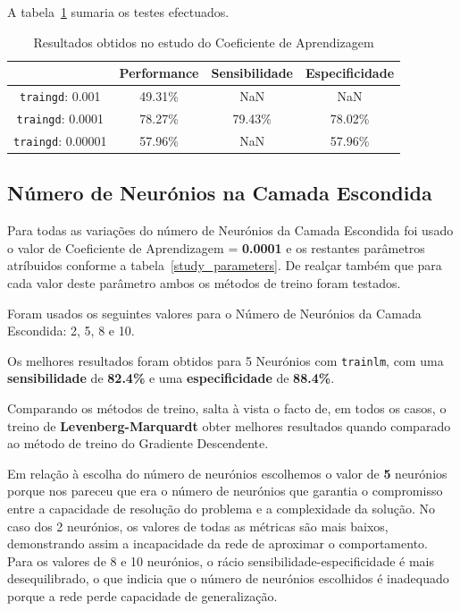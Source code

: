 \documentclass{article}
\begin{document}
A tabela~\ref{table_learning_rate} sumaria os testes efectuados.

\begin{table}[!h]
\centering
	\caption{Resultados obtidos no estudo do Coeficiente de Aprendizagem}
	\label{table_learning_rate}
	\begin{tabular}{|c|c|c|c|}
	\hline 
	 & \textbf{Performance} & \textbf{Sensibilidade} & \textbf{Especificidade} \\ 
	\hline 
	\texttt{traingd}: 0.001 & 49.31\%  & NaN & NaN \\ 
	\hline 
	\texttt{traingd}: 0.0001 & 78.27\% & 79.43\% & 78.02\% \\ 
	\hline 
	\texttt{traingd}: 0.00001 & 57.96\% & NaN & 57.96\% \\ 
	\hline 
	\end{tabular} 
\end{table}

\subsection{Número de Neurónios na Camada Escondida}
\indent \indent Para todas as variações do número de Neurónios da Camada Escondida foi usado o valor de Coeficiente de Aprendizagem = \textbf{0.0001} e os restantes parâmetros atríbuidos conforme a tabela~\ref{study_parameters}. De realçar também que para cada valor deste parâmetro ambos os métodos de treino foram testados.

Foram usados os seguintes valores para o Número de Neurónios da Camada Escondida: 2, 5, 8 e 10.

Os melhores resultados foram obtidos para 5 Neurónios com \texttt{trainlm}, com uma \textbf{sensibilidade} de \textbf{82.4\%} e uma \textbf{especificidade} de \textbf{88.4\%}.

Comparando os métodos de treino, salta à vista o facto de, em todos os casos, o treino de \textbf{Levenberg-Marquardt} obter melhores resultados quando comparado ao método de treino do Gradiente Descendente.

Em relação à escolha do número de neurónios escolhemos o valor de \textbf{5} neurónios porque nos pareceu que era o número de neurónios que garantia o compromisso entre a capacidade de resolução do problema e a complexidade da solução. No caso dos 2 neurónios, os valores de todas as métricas são mais baixos, demonstrando assim a incapacidade da rede de aproximar o comportamento. Para os valores de 8 e 10 neurónios, o rácio sensibilidade-especificidade é mais desequilibrado, o que indicia que o número de neurónios escolhidos é inadequado porque a rede perde capacidade de generalização.
\end{document}
